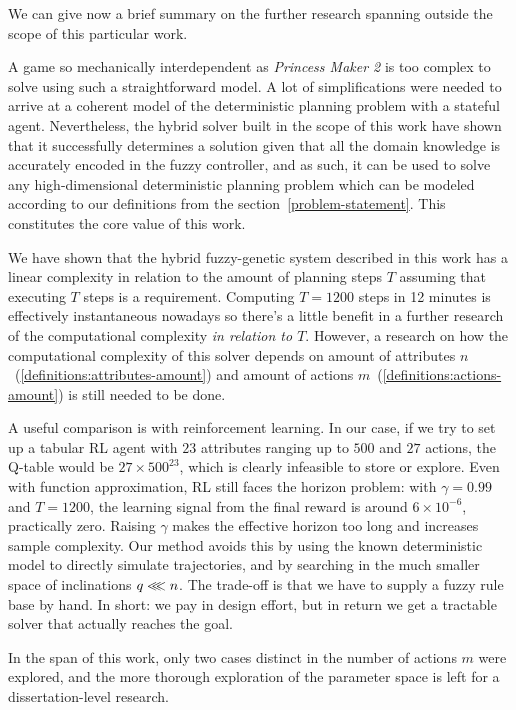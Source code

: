 \documentclass[12pt, a4paper]{report}
\begin{document}
	We can give now a brief summary on the further research spanning outside the scope of this particular work.
	
	A game so mechanically interdependent as \textit{Princess Maker 2} is too complex to solve using such a straightforward model.
	A lot of simplifications were needed to arrive at a coherent model of the deterministic planning problem with a stateful agent.
	Nevertheless, the hybrid solver built in the scope of this work have shown that it successfully determines a solution given that all the domain knowledge is accurately encoded in the fuzzy controller, and as such, it can be used to solve any high-dimensional deterministic planning problem which can be modeled according to our definitions from the section~\ref{problem-statement}.
	This constitutes the core value of this work.
	
	We have shown that the hybrid fuzzy-genetic system described in this work has a linear complexity in relation to the amount of planning steps $T$ assuming that executing $T$ steps is a requirement.
	Computing $T=1200$ steps in 12 minutes is effectively instantaneous nowadays so there's a little benefit in a further research of the computational complexity \textit{in relation to $T$}.
	However, a research on how the computational complexity of this solver depends on amount of attributes $n$~(\ref{definitions:attributes-amount}) and amount of actions $m$~(\ref{definitions:actions-amount}) is still needed to be done.


A useful comparison is with reinforcement learning. 
In our case, if we try to set up a tabular RL agent with $23$ attributes ranging up to $500$ and $27$ actions, the Q-table would be $27 \times 500^{23}$, which is clearly infeasible to store or explore.
Even with function approximation, RL still faces the horizon problem: with $\gamma = 0.99$ and $T = 1200$, the learning signal from the final reward is around $6 \times 10^{-6}$, practically zero.
Raising $\gamma$ makes the effective horizon too long and increases sample complexity.
Our method avoids this by using the known deterministic model to directly simulate trajectories, and by searching in the much smaller space of inclinations $q \llless n$. 
The trade-off is that we have to supply a fuzzy rule base by hand.
In short: we pay in design effort, but in return we get a tractable solver that actually reaches the goal.

	In the span of this work, only two cases distinct in the number of actions $m$ were explored, and the more thorough exploration of the parameter space is left for a dissertation-level research.
	
\end{document}
